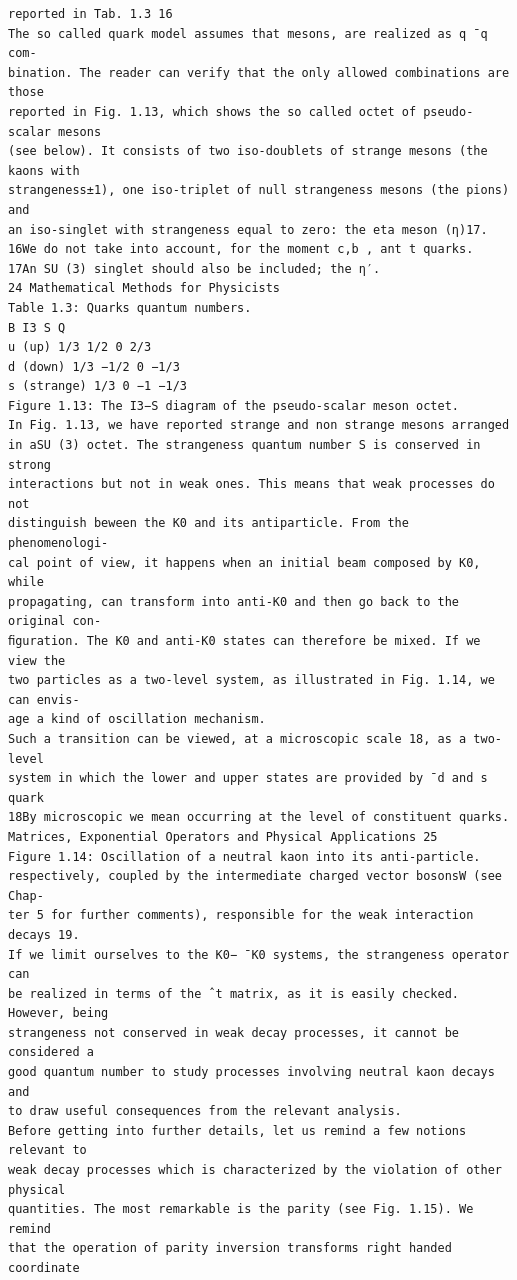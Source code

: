 \begin{verbatim}
reported in Tab. 1.3 16
The so called quark model assumes that mesons, are realized as q ¯q com-
bination. The reader can verify that the only allowed combinations are those
reported in Fig. 1.13, which shows the so called octet of pseudo-scalar mesons
(see below). It consists of two iso-doublets of strange mesons (the kaons with
strangeness±1), one iso-triplet of null strangeness mesons (the pions) and
an iso-singlet with strangeness equal to zero: the eta meson (η)17.
16We do not take into account, for the moment c,b , ant t quarks.
17An SU (3) singlet should also be included; the η′.
24 Mathematical Methods for Physicists
Table 1.3: Quarks quantum numbers.
B I3 S Q
u (up) 1/3 1/2 0 2/3
d (down) 1/3 −1/2 0 −1/3
s (strange) 1/3 0 −1 −1/3
Figure 1.13: The I3−S diagram of the pseudo-scalar meson octet.
In Fig. 1.13, we have reported strange and non strange mesons arranged
in aSU (3) octet. The strangeness quantum number S is conserved in strong
interactions but not in weak ones. This means that weak processes do not
distinguish beween the K0 and its antiparticle. From the phenomenologi-
cal point of view, it happens when an initial beam composed by K0, while
propagating, can transform into anti-K0 and then go back to the original con-
ﬁguration. The K0 and anti-K0 states can therefore be mixed. If we view the
two particles as a two-level system, as illustrated in Fig. 1.14, we can envis-
age a kind of oscillation mechanism.
Such a transition can be viewed, at a microscopic scale 18, as a two-level
system in which the lower and upper states are provided by ¯d and s quark
18By microscopic we mean occurring at the level of constituent quarks.
Matrices, Exponential Operators and Physical Applications 25
Figure 1.14: Oscillation of a neutral kaon into its anti-particle.
respectively, coupled by the intermediate charged vector bosonsW (see Chap-
ter 5 for further comments), responsible for the weak interaction decays 19.
If we limit ourselves to the K0− ¯K0 systems, the strangeness operator can
be realized in terms of the ˆt matrix, as it is easily checked. However, being
strangeness not conserved in weak decay processes, it cannot be considered a
good quantum number to study processes involving neutral kaon decays and
to draw useful consequences from the relevant analysis.
Before getting into further details, let us remind a few notions relevant to
weak decay processes which is characterized by the violation of other physical
quantities. The most remarkable is the parity (see Fig. 1.15). We remind
that the operation of parity inversion transforms right handed coordinate

\end{verbatim}
